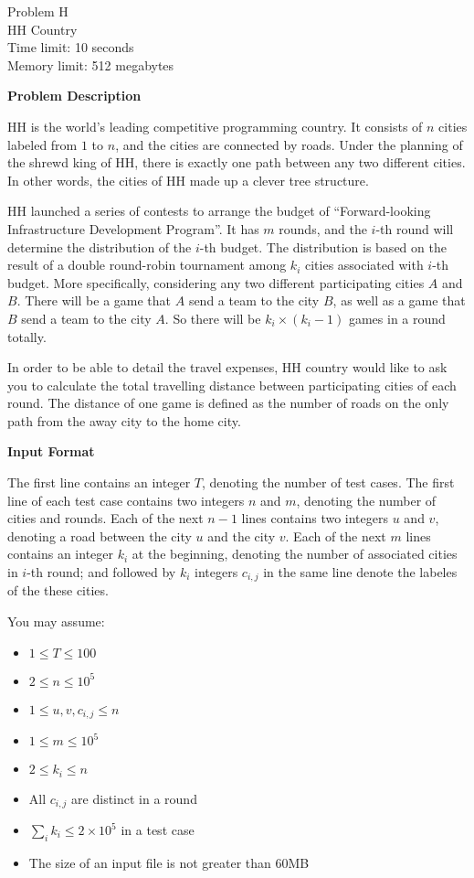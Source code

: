 \begin{center}
    {\LARGE Problem H}\vspace{1mm}\\
    {\Large HH Country}\\
    {Time limit: 10 seconds}\\
    {Memory limit: 512 megabytes}
\end{center}

\textbf{\large Problem Description}

HH is the world's leading competitive programming country.
It consists of $n$ cities labeled from $1$ to $n$, and the cities are connected by roads.
Under the planning of the shrewd king of HH, there is exactly one path between any two different cities.
In other words, the cities of HH made up a clever tree structure.

HH launched a series of contests to arrange the budget of ``Forward-looking Infrastructure Development Program''.
It has $m$ rounds, and the $i$-th round will determine the distribution of the $i$-th budget.
The distribution is based on the result of a double round-robin tournament among $k_i$ cities associated with $i$-th budget.
More specifically, considering any two different participating cities $A$ and $B$. There will be a game that $A$ send a team to the city $B$,
as well as a game that $B$ send a team to the city $A$. So there will be $k_i \times (k_i - 1)$ games in a round totally.

In order to be able to detail the travel expenses,
HH country would like to ask you to calculate the total travelling distance between participating cities of each round.
The distance of one game is defined as the number of roads on the only path from the away city to the home city.

\textbf{\large Input Format}

The first line contains an integer $T$, denoting the number of test cases.
The first line of each test case contains two integers $n$ and $m$, denoting the number of cities and rounds.
Each of the next $n - 1$ lines contains two integers $u$ and $v$, denoting a road between the city $u$ and the city $v$.
Each of the next $m$ lines contains an integer $k_i$ at the beginning, denoting the number of associated cities in $i$-th round;
and followed by $k_i$ integers $c_{i, j}$ in the same line denote the labeles of the these cities.

You may assume:
\begin{itemize}
    \tightlist{}
    \item $1 \le T \le 100$
    \item $2 \le n \le 10^5$
    \item $1 \le u, v, c_{i, j} \le n$
    \item $1 \le m \le 10^5$
    \item $2 \le k_i \le n$
    \item All $c_{i, j}$ are distinct in a round
    \item $\sum_i k_i \le 2 \times 10^5$ in a test case
    \item The size of an input file is not greater than 60MB
\end{itemize}

